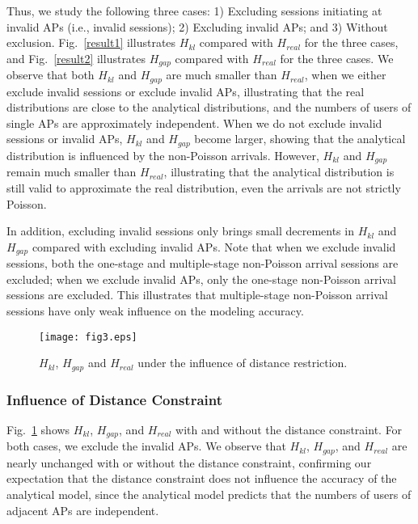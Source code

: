 Thus, we study the following three cases: 1) Excluding sessions initiating at invalid APs (i.e., invalid sessions); 2) Excluding invalid APs; and  3) Without exclusion.  Fig.~\ref{result1} illustrates $H_{kl}$ compared with $H_{real}$ for the three cases, and
Fig.~\ref{result2} illustrates $H_{gap}$ compared with $H_{real}$  for the three cases.
{We observe that both $H_{kl}$ and $H_{gap}$ are much smaller than $H_{real}$, when we either exclude invalid sessions or exclude invalid APs, illustrating that the real distributions are close to the analytical distributions,} and the numbers of users of single APs are approximately independent.
When we do not exclude invalid sessions or invalid APs, $H_{kl}$ and $H_{gap}$ become larger, showing that the analytical distribution is influenced by the non-Poisson arrivals. {However, $H_{kl}$ and $H_{gap}$ remain much smaller than $H_{real}$, illustrating that the analytical distribution is still valid to approximate the real distribution,}  even the arrivals are not strictly Poisson.

In addition, excluding invalid sessions only brings small decrements in $H_{kl}$ and $H_{gap}$ compared with excluding invalid APs. Note that when we exclude invalid sessions, both the one-stage and multiple-stage non-Poisson arrival sessions are excluded; when we exclude invalid APs, only the one-stage non-Poisson arrival sessions are excluded. This illustrates that multiple-stage non-Poisson arrival sessions have only weak influence on the modeling accuracy.




\begin{figure}[tbp]
\centering
\texttt{[image: fig3.eps]}
\caption{$H_{kl}$, $H_{gap}$ and $H_{real}$ under the influence of distance restriction.}
\label{result3}
\end{figure}


\subsubsection{Influence of Distance Constraint}
Fig.~\ref{result3} shows $H_{kl}$, $H_{gap}$, and $H_{real}$ with and without the distance constraint. For both cases, we exclude the invalid APs.  We observe that $H_{kl}$, $H_{gap}$, and $H_{real}$ are nearly unchanged with or without the distance constraint, confirming our expectation that the distance constraint does not influence the accuracy of the analytical model, since the analytical model predicts that the numbers of users of adjacent APs are independent.


